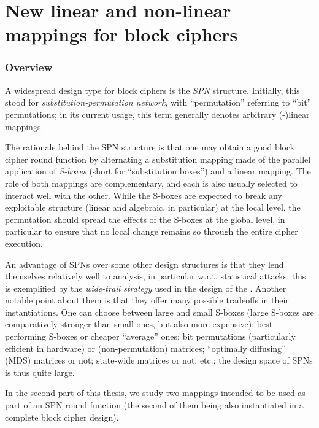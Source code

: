 \part[Nouvelles constructions linéaires et non-linéaires pour chiffres par bloc]
	{New linear and non-linear mappings for block ciphers}
\label{part:constructions}

\section*{Overview}

A widespread design type for block ciphers is the \emph{SPN} structure. Initially, this stood for \emph{substitution-permutation network},
with ``permutation'' referring to ``bit'' permutations; in its current usage, this term generally denotes arbitrary (\ftwo-)linear
mappings.

The rationale behind the SPN structure is that one may obtain a good block cipher round function by alternating a substitution
mapping made of the parallel application of \emph{S-boxes} (short for ``substitution boxes'') and a linear mapping. The role
of both mappings are complementary, and each is also usually selected to interact well with the other. While the S-boxes
are expected to break any exploitable structure (linear and algebraic, in particular) at the local level, the permutation
should spread the effects of the S-boxes at the global level, in particular to ensure that no local change remains so through
the entire cipher execution.

An advantage of SPNs over some other design structures is that they lend themselves relatively well to analysis, in particular w.r.t.
statistical attacks; this is exemplified by the \emph{wide-trail strategy} used in the design of the \aes. Another notable point
about them is that they offer many possible tradeoffs in their instantiations. One can choose between large and small S-boxes
(large S-boxes are comparatively stronger than small ones, but also more expensive); best-performing S-boxes or cheaper
``average'' ones; bit permutations (particularly efficient in hardware) or (non-permutation) matrices; ``optimally diffusing'' (MDS)
matrices or not; state-wide matrices or not, etc.; the design space of SPNs is thus quite large.

\bigskip

In the second part of this thesis, we study two mappings intended to be used as part of an SPN round function (the second
of them being also instantiated in a complete block cipher design).

